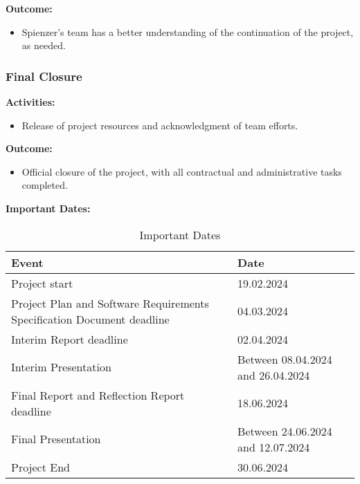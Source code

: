 \documentclass[12pt,a4paper]{article}
\begin{document}
\noindent \textbf{Outcome:}
\begin{itemize}
    \item Spienzer’s team has a better understanding of the continuation of the project, as needed.
\end{itemize}

\subsubsection{Final Closure}

\noindent \textbf{Activities:}
\begin{itemize}
    \item Release of project resources and acknowledgment of team efforts.
\end{itemize}

\noindent \textbf{Outcome:}
\begin{itemize}
    \item Official closure of the project, with all contractual and administrative tasks completed.
\end{itemize}


\newpage %

\begin{center} %
{\small\bfseries Important Dates:\par} %
\end{center}

\begin{table}[h!]
\centering
\begin{adjustbox}{scale=1,center}
\begin{tabular}{|p{10cm}|p{9cm}|} %
\hline
\textbf{Event} & \textbf{Date} \\
\hline
Project start & 19.02.2024 \\ \hline
Project Plan and Software Requirements Specification Document deadline & 04.03.2024 \\ \hline
Interim Report deadline & 02.04.2024 \\ \hline
Interim Presentation & Between 08.04.2024 and 26.04.2024 \\ \hline
Final Report and Reflection Report deadline & 18.06.2024 \\ \hline
Final Presentation & Between 24.06.2024 and 12.07.2024 \\ \hline
Project End & 30.06.2024 \\
\hline
\end{tabular}
\end{adjustbox}
\caption{Important Dates}
\end{table}
\vspace{\baselineskip} %
\end{document}
